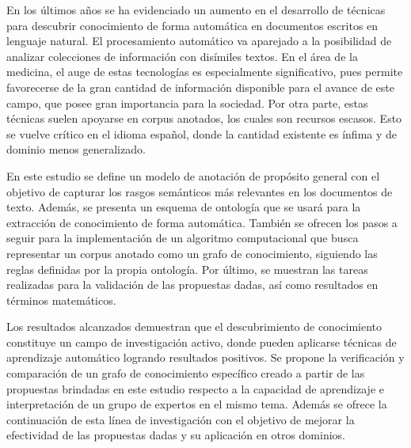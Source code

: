 \label{chapter:abstract_spanish}

En los últimos años se ha evidenciado un aumento en el desarrollo de técnicas para descubrir conocimiento de forma automática en documentos escritos en lenguaje natural. El procesamiento automático va aparejado a la posibilidad de analizar colecciones de información con disímiles textos. En el área de la medicina, el auge de estas tecnologías es especialmente significativo, pues permite favorecerse de la gran cantidad de información disponible para el avance de este campo, que posee gran importancia para la sociedad. Por otra parte, estas técnicas suelen apoyarse en corpus anotados, los cuales son recursos escasos. Esto se vuelve crítico en el idioma español, donde la cantidad existente es ínfima y de dominio menos generalizado.

En este estudio se define un modelo de anotación de propósito general con el objetivo de capturar los rasgos semánticos más relevantes en los documentos de texto. Además, se presenta un esquema de ontología que se usará para la extracción de conocimiento de forma automática. También se ofrecen los pasos a seguir para la implementación de un algoritmo computacional que busca representar un corpus anotado como un grafo de conocimiento, siguiendo las reglas definidas por la propia ontología. Por último, se muestran las tareas realizadas para la validación de las propuestas dadas, así como resultados en términos matemáticos.

Los resultados alcanzados demuestran que el descubrimiento de conocimiento constituye un campo de investigación activo, donde pueden aplicarse técnicas de aprendizaje automático logrando resultados positivos. Se propone la verificación y comparación de un grafo de conocimiento específico creado a partir de las propuestas brindadas en este estudio respecto a la capacidad de aprendizaje e interpretación de un grupo de expertos en el mismo tema. Además se ofrece la continuación de esta línea de investigación con el objetivo de mejorar la efectividad de las propuestas dadas y su aplicación en otros dominios.